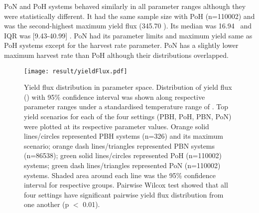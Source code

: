 \documentclass[../thesis.tex]{subfiles} %
\begin{document}
PoN and PoH systems behaved similarly in all parameter ranges although they were statistically different.  It had the same sample size with PoH (n=110002) and was the second-highest maximum yield flux (345.70 \dxdt).  Its median was 16.94 \dxdt\ and IQR was [9.43-40.99] \dxdt.  PoN had its parameter limits and maximum yield same as PoH systems except for the harvest rate parameter.  PoN has a slightly lower maximum harvest rate than PoH although their distributions overlapped.

\begin{figure}[H]
    \centering
    \texttt{[image: result/yieldFlux.pdf]}
    \caption[Yield flux distribution in parameter space]{Yield flux distribution in parameter space.  Distribution of yield flux (\dxdt) with 95\% confidence interval was shown along respective parameter ranges under a standardised temperature range of \temp.  Top yield scenarios for each of the four settings (PBH, PoH, PBN, PoN) were plotted at its respective parameter values.  Orange solid lines/circles represented PBH systems (n=326) and its maximum scenario; orange dash lines/triangles represented PBN systems (n=86538); green solid lines/circles represented PoH (n=110002) systems; green dash lines/triangles represented PoN (n=110002) systems.  Shaded area around each line was the 95\% confidence interval for respective groups.  Pairwise Wilcox test showed that all four settings have significant pairwise yield flux distribution from one another (p $<$ 0.01).}
    \label{f:ydByPara}
\end{figure}
\end{document}
